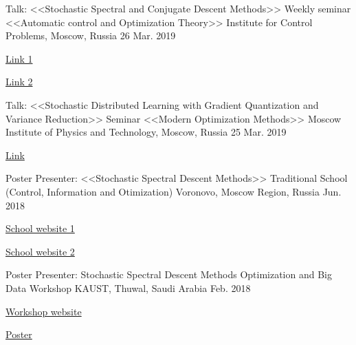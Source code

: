 


\begin{cventries}


\cventry
{Talk: <<Stochastic Spectral and Conjugate Descent Methods>>} %
{Weekly seminar <<Automatic control and Optimization Theory>>} %
{Institute for Control Problems, Moscow, Russia} %
{26 Mar. 2019} %
{ %
	\begin{cvitems}
		\item {\href{http://www.mathnet.ru/php/seminars.phtml?option_lang=rus&presentid=23658}{Link 1}}
		\item {\href{https://www.ipu.ru/node/50794}{Link 2}}
	\end{cvitems}
}

\cventry
{Talk: <<Stochastic Distributed Learning with Gradient Quantization and Variance Reduction>>}
{Seminar <<Modern Optimization Methods>>}
{Moscow Institute of Physics and Technology, Moscow, Russia}
{25 Mar. 2019}
{
	\begin{cvitems}
		\item {\href{https://vk.com/miptopt?w=wall-132864820_40\%2Fall}{Link}}
	\end{cvitems}
}

\cventry
{Poster Presenter: <<Stochastic Spectral Descent Methods>>} %
{Traditional School (Control, Information and Otimization)} %
{Voronovo, Moscow Region, Russia} %
{Jun. 2018} %
{ %
	\begin{cvitems}
		\item {\href{https://sites.google.com/site/traditionalschool/}{School website 1}}
		\item {\href{http://ssopt.org}{School website 2}}
	\end{cvitems}
}

\cventry
{Poster Presenter: Stochastic Spectral Descent Methods} %
{Optimization and Big Data Workshop} %
{KAUST, Thuwal, Saudi Arabia} %
{Feb. 2018} %
{ %
	\begin{cvitems}
		\item {\href{https://obd.kaust.edu.sa/}{Workshop website}}
		\item {\href{https://epostersonline.com/obd2018/node/51}{Poster}}
	\end{cvitems}
}







\end{cventries}